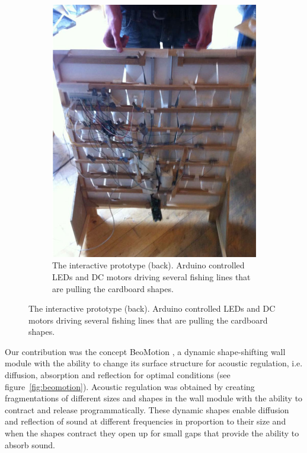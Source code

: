 \begin{figure}[h]
\begin{subfigure}{.44\textwidth}
		\includegraphics[width=\linewidth]{figures/beomotion/prototype_back}
		\caption{The interactive prototype (back). Arduino controlled LEDs and DC motors driving several fishing lines that are pulling the cardboard shapes.}
		\label{fig:beomotion:proto_back}
	\end{subfigure}
\end{figure}

Our contribution was the concept BeoMotion \citep{beomotionreportstefan, beomotionreporttore}, a dynamic shape-shifting wall module with the ability to change its surface structure for acoustic regulation, i.e. diffusion, absorption and reflection for optimal conditions (see figure~\ref{fig:beomotion}).
Acoustic regulation was obtained by creating fragmentations of different sizes and shapes in the wall module with the ability to contract and release programmatically.
These dynamic shapes enable diffusion and reflection of sound at different frequencies in proportion to their size and when the shapes contract they open up for small gaps that provide the ability to absorb sound. 

